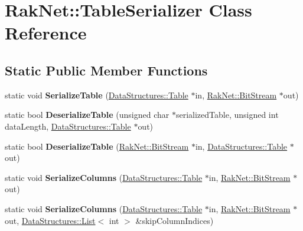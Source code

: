 \hypertarget{class_rak_net_1_1_table_serializer}{\section{Rak\-Net\-:\-:Table\-Serializer Class Reference}
\label{class_rak_net_1_1_table_serializer}
}
\subsection*{Static Public Member Functions}
\begin{DoxyCompactItemize}
\item 
\hypertarget{class_rak_net_1_1_table_serializer_afd1cf9ab3f3f82bc18d8fefc60bc5beb}{static void {\bfseries Serialize\-Table} (\hyperlink{class_data_structures_1_1_table}{Data\-Structures\-::\-Table} $\ast$in, \hyperlink{class_rak_net_1_1_bit_stream}{Rak\-Net\-::\-Bit\-Stream} $\ast$out)}\label{class_rak_net_1_1_table_serializer_afd1cf9ab3f3f82bc18d8fefc60bc5beb}

\item 
\hypertarget{class_rak_net_1_1_table_serializer_a3b1a946b76feb924ab2d4dc4a2266f86}{static bool {\bfseries Deserialize\-Table} (unsigned char $\ast$serialized\-Table, unsigned int data\-Length, \hyperlink{class_data_structures_1_1_table}{Data\-Structures\-::\-Table} $\ast$out)}\label{class_rak_net_1_1_table_serializer_a3b1a946b76feb924ab2d4dc4a2266f86}

\item 
\hypertarget{class_rak_net_1_1_table_serializer_ac600f3431143ed81261c8fd9d6e22bea}{static bool {\bfseries Deserialize\-Table} (\hyperlink{class_rak_net_1_1_bit_stream}{Rak\-Net\-::\-Bit\-Stream} $\ast$in, \hyperlink{class_data_structures_1_1_table}{Data\-Structures\-::\-Table} $\ast$out)}\label{class_rak_net_1_1_table_serializer_ac600f3431143ed81261c8fd9d6e22bea}

\item 
\hypertarget{class_rak_net_1_1_table_serializer_aecb8e344c070ed1639344a7350cedb8e}{static void {\bfseries Serialize\-Columns} (\hyperlink{class_data_structures_1_1_table}{Data\-Structures\-::\-Table} $\ast$in, \hyperlink{class_rak_net_1_1_bit_stream}{Rak\-Net\-::\-Bit\-Stream} $\ast$out)}\label{class_rak_net_1_1_table_serializer_aecb8e344c070ed1639344a7350cedb8e}

\item 
\hypertarget{class_rak_net_1_1_table_serializer_af8d4e4c5cad478f5f14a70e439969f05}{static void {\bfseries Serialize\-Columns} (\hyperlink{class_data_structures_1_1_table}{Data\-Structures\-::\-Table} $\ast$in, \hyperlink{class_rak_net_1_1_bit_stream}{Rak\-Net\-::\-Bit\-Stream} $\ast$out, \hyperlink{class_data_structures_1_1_list}{Data\-Structures\-::\-List}$<$ int $>$ \&skip\-Column\-Indices)}\label{class_rak_net_1_1_table_serializer_af8d4e4c5cad478f5f14a70e439969f05}


\end{DoxyCompactItemize}
